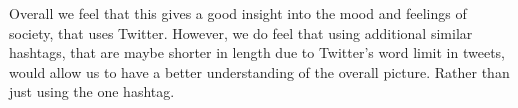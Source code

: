 \documentclass[a4paper,10pt]{article}
\begin{document}
	Overall we feel that this gives a good insight into the mood and feelings of society, that uses Twitter. However, we do feel that using additional similar hashtags, that are maybe shorter in length due to Twitter's word limit in tweets, would allow us to have a better understanding of the overall picture. Rather than just using the one hashtag.
	
	
	\newpage

	
	
	{\footnotesize
		
	}
	
	
\end{document}
